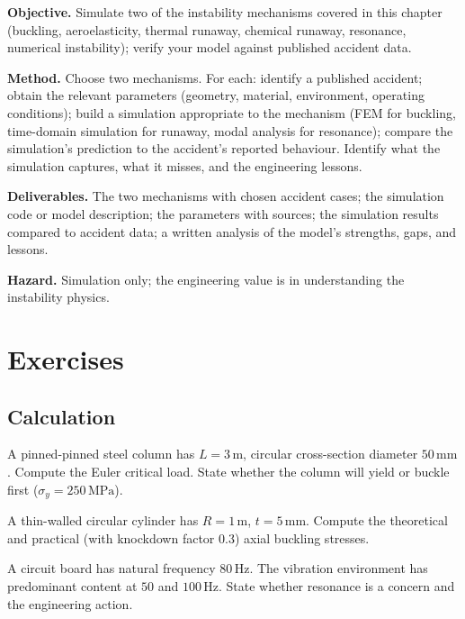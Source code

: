 \begin{project}
\textbf{Objective.} Simulate two of the instability mechanisms covered in this chapter (buckling, aeroelasticity, thermal runaway, chemical runaway, resonance, numerical instability); verify your model against published accident data.

\textbf{Method.} Choose two mechanisms. For each: identify a published accident; obtain the relevant parameters (geometry, material, environment, operating conditions); build a simulation appropriate to the mechanism (FEM for buckling, time-domain simulation for runaway, modal analysis for resonance); compare the simulation's prediction to the accident's reported behaviour. Identify what the simulation captures, what it misses, and the engineering lessons.

\textbf{Deliverables.} The two mechanisms with chosen accident cases; the simulation code or model description; the parameters with sources; the simulation results compared to accident data; a written analysis of the model's strengths, gaps, and lessons.

\textbf{Hazard.} Simulation only; the engineering value is in understanding the instability physics.
\end{project}

\section{Exercises}

\subsection*{Calculation}

\begin{exercise}
A pinned-pinned steel column has $L = 3\,\text{m}$, circular cross-section diameter $50\,\text{mm}$. Compute the Euler critical load. State whether the column will yield or buckle first ($\sigma_y = 250\,\text{MPa}$).
\end{exercise}

\begin{exercise}
A thin-walled circular cylinder has $R = 1\,\text{m}$, $t = 5\,\text{mm}$. Compute the theoretical and practical (with knockdown factor $0.3$) axial buckling stresses.
\end{exercise}

\begin{exercise}
A circuit board has natural frequency $80\,\text{Hz}$. The vibration environment has predominant content at $50$ and $100\,\text{Hz}$. State whether resonance is a concern and the engineering action.
\end{exercise}

